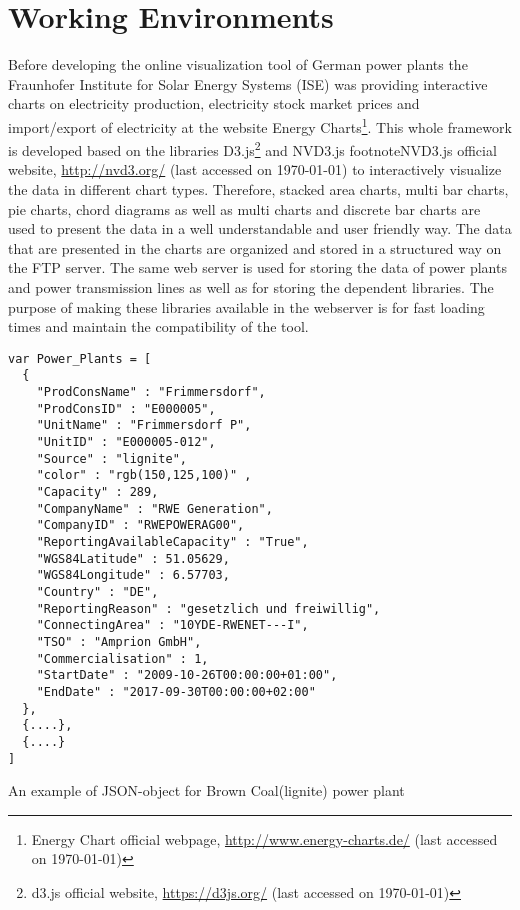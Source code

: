 \section{Working Environments}

Before developing the online visualization tool of German power plants the Fraunhofer Institute for Solar Energy Systems (ISE) was providing interactive charts on electricity production, electricity stock market prices and import/export of electricity at the website Energy Charts\footnote{Energy Chart official webpage, \url{http://www.energy-charts.de/} (last accessed on {\today})}. This whole framework is developed based on the libraries D3.js\footnote{d3.js official website, \url{https://d3js.org/} (last accessed on {\today})}  and NVD3.js footnote{NVD3.js official website, \url{http://nvd3.org/} (last accessed on {\today})} to interactively visualize the data in different chart types. Therefore, stacked area charts, multi bar charts, pie charts, chord diagrams as well as multi charts and discrete bar charts are used to present the data in a well understandable and user friendly way. The data that are presented in the charts are organized and stored in a structured way on the FTP server. The same web server is used for storing the data of power plants and power transmission lines as well as for storing the dependent libraries. The purpose of making these libraries available in the webserver is for fast loading times and maintain the compatibility of the tool.

\begin{Listing}
\begin{lstlisting}
var Power_Plants = [
  { 
    "ProdConsName" : "Frimmersdorf",
    "ProdConsID" : "E000005",
    "UnitName" : "Frimmersdorf P",
    "UnitID" : "E000005-012",
    "Source" : "lignite",
    "color" : "rgb(150,125,100)" ,
    "Capacity" : 289,
    "CompanyName" : "RWE Generation",
    "CompanyID" : "RWEPOWERAG00",
    "ReportingAvailableCapacity" : "True",
    "WGS84Latitude" : 51.05629,
    "WGS84Longitude" : 6.57703,
    "Country" : "DE",
    "ReportingReason" : "gesetzlich und freiwillig",
    "ConnectingArea" : "10YDE-RWENET---I",
    "TSO" : "Amprion GmbH",
    "Commercialisation" : 1,
    "StartDate" : "2009-10-26T00:00:00+01:00",
    "EndDate" : "2017-09-30T00:00:00+02:00"
  },
  {....},
  {....}
]
\end{lstlisting}
\caption{An example of JSON-object for Brown Coal(lignite) power plant}
\label{lst:pp-json}
\end{Listing}

